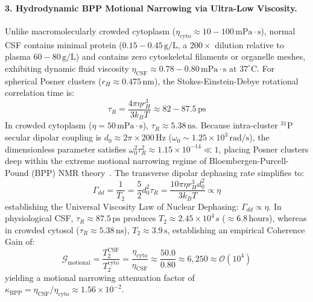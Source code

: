 \documentclass[10pt,twocolumn,3p]{article}
\begin{document}
\paragraph{3. Hydrodynamic BPP Motional Narrowing via Ultra-Low Viscosity.}
Unlike macromolecularly crowded cytoplasm ($\eta_{\text{cyto}} \approx 10 - 100\,\text{mPa}\cdot\text{s}$), normal CSF contains minimal protein ($0.15 - 0.45\,\text{g/L}$, a $200\times$ dilution relative to plasma $60 - 80\,\text{g/L}$) and contains zero cytoskeletal filaments or organelle meshes, exhibiting dynamic fluid viscosity $\eta_{\text{CSF}} \approx 0.78 - 0.80\,\text{mPa}\cdot\text{s}$ at $37^\circ\text{C}$. For spherical Posner clusters ($r_H \approx 0.475\,\text{nm}$), the Stokes-Einstein-Debye rotational correlation time is:
\begin{equation}
    \tau_R = \frac{4\pi \eta r_H^3}{3 k_B T} \approx 82 - 87.5\,\text{ps}
    \label{eq:tau_rotational}
\end{equation}
In crowded cytoplasm ($\eta = 50\,\text{mPa}\cdot\text{s}$), $\tau_R \approx 5.38\,\text{ns}$. Because intra-cluster $^{31}\text{P}$ secular dipolar coupling is $d_0 \approx 2\pi \times 200\,\text{Hz}$ ($\omega_0 \sim 1.25 \times 10^3\,\text{rad/s}$), the dimensionless parameter satisfies $\omega_0^2 \tau_R^2 \approx 1.15 \times 10^{-14} \ll 1$, placing Posner clusters deep within the extreme motional narrowing regime of Bloembergen-Purcell-Pound (BPP) NMR theory~\cite{bpp1948}. The transverse dipolar dephasing rate simplifies to:
\begin{equation}
    \Gamma_{dd} = \frac{1}{T_2} = \frac{5}{2} d_0^2 \tau_R = \frac{10 \pi \eta r_H^3 d_0^2}{3 k_B T} \propto \eta
    \label{eq:bpp_viscosity_law}
\end{equation}
establishing the Universal Viscosity Law of Nuclear Dephasing: $\Gamma_{dd} \propto \eta$. In physiological CSF, $\tau_R \approx 87.5\,\text{ps}$ produces $T_2 \approx 2.45 \times 10^4\,\text{s}$ ($\approx 6.8\,\text{hours}$), whereas in crowded cytosol ($\tau_R \approx 5.38\,\text{ns}$), $T_2 \approx 3.9\,\text{s}$, establishing an empirical Coherence Gain of:
\begin{equation}
    \mathcal{G}_{\text{motional}} = \frac{T_2^{\text{CSF}}}{T_2^{\text{cyto}}} = \frac{\eta_{\text{cyto}}}{\eta_{\text{CSF}}} \approx \frac{50.0}{0.80} \approx 6,250 \approx \mathcal{O}(10^4)
\end{equation}
yielding a motional narrowing attenuation factor of $\kappa_{\text{BPP}} = \eta_{\text{CSF}} / \eta_{\text{cyto}} \approx 1.56 \times 10^{-2}$.
\end{document}
